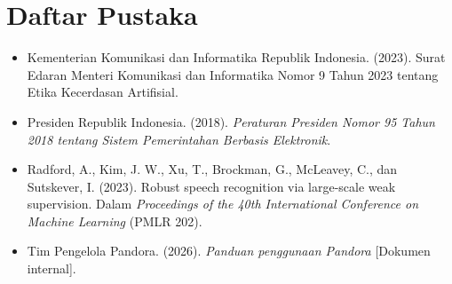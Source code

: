 \chapter*{Daftar Pustaka}

\begin{itemize}[leftmargin=1cm, itemindent=-1cm, label={}, itemsep=8pt]
  \item Kementerian Komunikasi dan Informatika Republik Indonesia. (2023). Surat Edaran Menteri Komunikasi dan Informatika Nomor 9 Tahun 2023 tentang Etika Kecerdasan Artifisial.
  \item Presiden Republik Indonesia. (2018). \textit{Peraturan Presiden Nomor 95 Tahun 2018 tentang Sistem Pemerintahan Berbasis Elektronik}.
  \item Radford, A., Kim, J. W., Xu, T., Brockman, G., McLeavey, C., dan Sutskever, I. (2023). Robust speech recognition via large-scale weak supervision. Dalam \textit{Proceedings of the 40th International Conference on Machine Learning} (PMLR 202).
  \item Tim Pengelola Pandora. (2026). \textit{Panduan penggunaan Pandora} [Dokumen internal].
\end{itemize}
